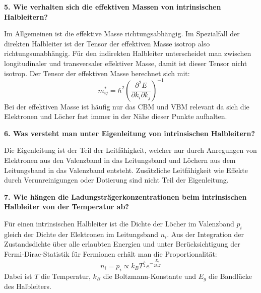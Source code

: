 \noindent\textbf{5. Wie verhalten sich die effektiven Massen von intrinsischen Halbleitern?}\\
\begin{addmargin}[25pt]{0pt}
Im Allgemeinen ist die effektive Masse richtungsabhängig. Im Spezialfall der direkten Halbleiter ist der Tensor der effektiven Masse isotrop also richtungsunabhängig. Für den indirekten Halbleiter unterscheidet man zwischen longitudinaler und transversaler effektiver Masse, damit ist dieser Tensor nicht isotrop.  Der Tensor der effektiven Masse berechnet sich mit:
\begin{equation}\label{eq:effektive_Masse}
    m^*_{ij} = \hbar^2 \left(\frac{\partial^2 E}{\partial k_i\partial k_j}\right)^{-1}
\end{equation}
Bei der effektiven Masse ist häufig nur das CBM und VBM relevant da sich die Elektronen und Löcher fast immer in der Nähe dieser Punkte aufhalten.\\

\end{addmargin}

\noindent\textbf{6. Was versteht man unter Eigenleitung von intrinsischen Halbleitern?}\\
\begin{addmargin}[25pt]{0pt}
Die Eigenleitung ist der Teil der Leitfähigkeit, welcher nur durch Anregungen von Elektronen aus den Valenzband in das Leitungsband und Löchern aus dem Leitungsband in das Valenzband entsteht. Zusätzliche Leitfähigkeit wie Effekte durch Verunreinigungen oder Dotierung sind nicht Teil der Eigenleitung. \\
\end{addmargin}

\noindent\textbf{7. Wie hängen die Ladungsträgerkonzentrationen beim intrinsischen Halbleiter von der Temperatur ab?}\\
\begin{addmargin}[25pt]{0pt}
Für einen intrinsischen Halbleiter ist die Dichte der Löcher im Valenzband $p_i$ gleich der Dichte der Elektronen im Leitungsband $n_i$. Aus der Integration der Zustandsdichte über alle erlaubten Energien und unter Berücksichtigung der Fermi-Dirac-Statistik für Fermionen erhält man die Proportionalität:
\begin{equation}\label{eq:Ladungsträgerdichte_intrinsisch_Temperatur}
    n_i = p_i \propto k_BT^{\frac{3}{2}}e^{-\frac{E_g}{2k_bT}}
\end{equation}
Dabei ist $T$ die Temperatur, $k_B$ die Boltzmann-Konstante und $E_g$ die Bandlücke des Halbleiters.\\
\end{addmargin}

